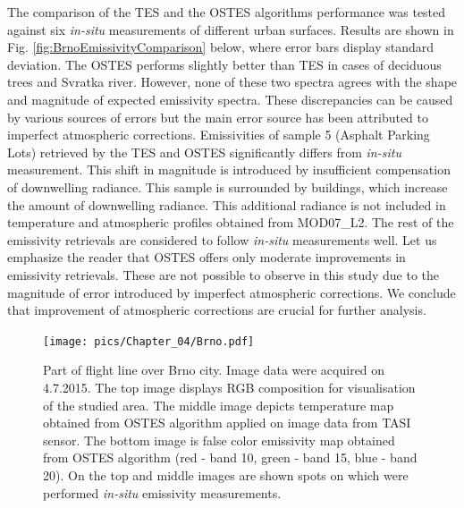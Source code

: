 The comparison of  the TES and the OSTES algorithms performance was tested against six \textit{in-situ} measurements of different urban surfaces. Results are shown in Fig. \ref{fig:BrnoEmissivityComparison} below, where error bars display standard deviation. The OSTES performs slightly better than TES in cases of deciduous trees and Svratka river. However, none of these two spectra agrees with the shape and magnitude of expected emissivity spectra. These discrepancies can be caused by various sources of errors but the main error source has been attributed to imperfect atmospheric corrections. Emissivities of sample 5 (Asphalt Parking Lots) retrieved by the TES and OSTES significantly differs from \textit{in-situ} measurement. This shift in magnitude is introduced by insufficient compensation of downwelling radiance. This sample is surrounded by buildings, which increase the amount of downwelling radiance. This additional radiance is not included in temperature and atmospheric profiles obtained from MOD07\_L2. The rest of the emissivity retrievals are considered to follow \textit{in-situ} measurements well. Let us emphasize the reader that OSTES offers only moderate improvements in emissivity retrievals. These are not possible to observe in this study due to the magnitude of error introduced by imperfect atmospheric corrections. We conclude that improvement of atmospheric corrections are crucial for further analysis.

\begin{figure}[!t]
\centering
\vspace{0.8 em}
\texttt{[image: pics/Chapter\_04/Brno.pdf]}
\vspace{2 em}
\caption{
Part of flight line over Brno city. Image data were acquired on 4.7.2015. The top image displays RGB composition for visualisation of the studied area. The middle image depicts temperature map obtained from OSTES algorithm applied on image data from TASI sensor. The bottom image is false color emissivity map obtained from OSTES algorithm (red - band 10, green - band 15, blue - band 20). On the top and middle images are shown spots on which were performed \textit{in-situ} emissivity measurements.}
\label{fig:Bajkal}
\end{figure}

